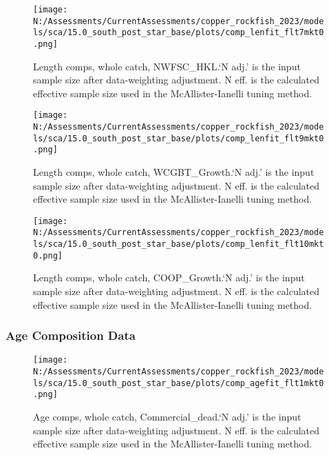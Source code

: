 \documentclass[11pt,
  english,
  letterpaper,
]{article}
\begin{document}
\begin{figure}
\centering
\texttt{[image: N:/Assessments/CurrentAssessments/copper\_rockfish\_2023/models/sca/15.0\_south\_post\_star\_base/plots/comp\_lenfit\_flt7mkt0.png]}
\caption{Length comps, whole catch, NWFSC\_HKL.`N adj.' is the input sample size after data-weighting adjustment. N eff. is the calculated effective sample size used in the McAllister-Ianelli tuning method.\label{fig:comp_lenfit_flt7mkt0}}
\end{figure}

\begin{figure}
\centering
\texttt{[image: N:/Assessments/CurrentAssessments/copper\_rockfish\_2023/models/sca/15.0\_south\_post\_star\_base/plots/comp\_lenfit\_flt9mkt0.png]}
\caption{Length comps, whole catch, WCGBT\_Growth.`N adj.' is the input sample size after data-weighting adjustment. N eff. is the calculated effective sample size used in the McAllister-Ianelli tuning method.\label{fig:comp_lenfit_flt9mkt0}}
\end{figure}

\begin{figure}
\centering
\texttt{[image: N:/Assessments/CurrentAssessments/copper\_rockfish\_2023/models/sca/15.0\_south\_post\_star\_base/plots/comp\_lenfit\_flt10mkt0.png]}
\caption{Length comps, whole catch, COOP\_Growth.`N adj.' is the input sample size after data-weighting adjustment. N eff. is the calculated effective sample size used in the McAllister-Ianelli tuning method.\label{fig:comp_lenfit_flt10mkt0}}
\end{figure}

\newpage

\hypertarget{age-data}{%
\subsubsection{Age Composition Data}\label{age-data}}

\begin{figure}
\centering
\texttt{[image: N:/Assessments/CurrentAssessments/copper\_rockfish\_2023/models/sca/15.0\_south\_post\_star\_base/plots/comp\_agefit\_flt1mkt0.png]}
\caption{Age comps, whole catch, Commercial\_dead.`N adj.' is the input sample size after data-weighting adjustment. N eff. is the calculated effective sample size used in the McAllister-Ianelli tuning method.\label{fig:comp_agefit_flt1mkt0}}
\end{figure}
\end{document}
